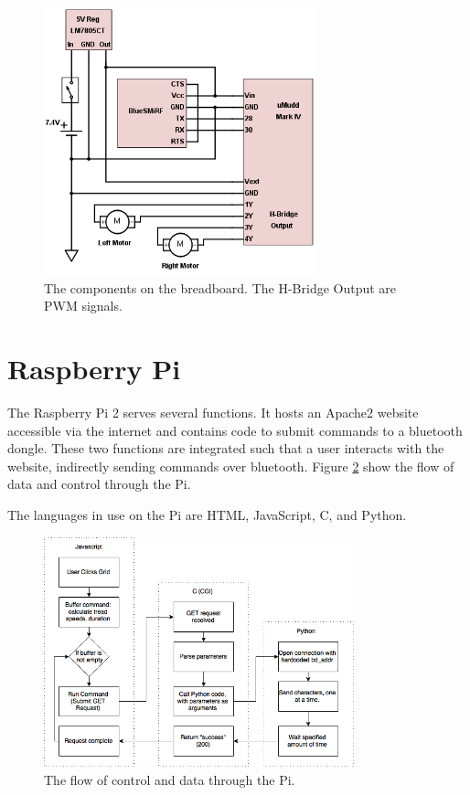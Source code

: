 \documentclass[12pt]{article}
\begin{document}
\begin{figure}
\begin{center}
\includegraphics[width=0.7\textwidth]{breadboard}
\end{center}
\caption{The components on the breadboard. The H-Bridge Output are PWM signals.}
\label{fig:breadboard}
\end{figure}

\section{Raspberry Pi}

The Raspberry Pi 2 serves several functions. It hosts an Apache2 website accessible via the internet and contains code to submit commands to a bluetooth dongle. These two functions are integrated such that a user interacts with the website, indirectly sending commands over bluetooth. Figure \ref{fig:piroutines} show the flow of data and control through the Pi.

The languages in use on the Pi are HTML, JavaScript, C, and Python.

\begin{figure}
\begin{center}
\includegraphics[width=0.8\textwidth]{PiRoutines}
\end{center}
\caption{The flow of control and data through the Pi.}
\label{fig:piroutines}
\end{figure}
\end{document}

